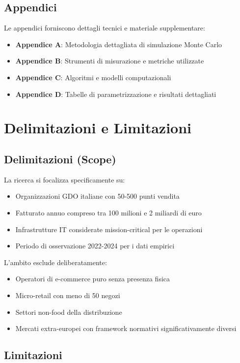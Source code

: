 \subsection{Appendici}

Le appendici forniscono dettagli tecnici e materiale supplementare:
\begin{itemize}
\item \textbf{Appendice A}: Metodologia dettagliata di simulazione Monte Carlo
\item \textbf{Appendice B}: Strumenti di misurazione e metriche utilizzate
\item \textbf{Appendice C}: Algoritmi e modelli computazionali
\item \textbf{Appendice D}: Tabelle di parametrizzazione e risultati dettagliati
\end{itemize}

\section{Delimitazioni e Limitazioni}

\subsection{Delimitazioni (Scope)}

La ricerca si focalizza specificamente su:
\begin{itemize}
\item Organizzazioni GDO italiane con 50-500 punti vendita
\item Fatturato annuo compreso tra 100 milioni e 2 miliardi di euro
\item Infrastrutture IT considerate mission-critical per le operazioni
\item Periodo di osservazione 2022-2024 per i dati empirici
\end{itemize}

L'ambito esclude deliberatamente:
\begin{itemize}
\item Operatori di e-commerce puro senza presenza fisica
\item Micro-retail con meno di 50 negozi
\item Settori non-food della distribuzione
\item Mercati extra-europei con framework normativi significativamente diversi
\end{itemize}

\subsection{Limitazioni}

